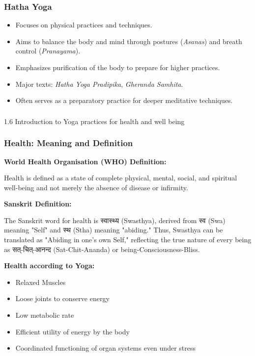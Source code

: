 \begin{frame}[fragile]\frametitle{Hatha Yoga}

      \begin{itemize}
		\item Focuses on physical practices and techniques.
		\item Aims to balance the body and mind through postures (\textit{Asanas}) and breath control (\textit{Pranayama}).
		\item Emphasizes purification of the body to prepare for higher practices.
		\item Major texts: \textit{Hatha Yoga Pradipika}, \textit{Gheranda Samhita}.
		\item Often serves as a preparatory practice for deeper meditative techniques.
	  \end{itemize}

\end{frame}



\begin{frame}[fragile]\frametitle{}
\begin{center}
{\Large 1.6 Introduction to Yoga practices for health and well being}
\end{center}
\end{frame}

\begin{frame}[fragile]\frametitle{Health: Meaning and Definition}
    \textbf{World Health Organisation (WHO) Definition:}
    
        Health is defined as a state of complete physical, mental, social, and spiritual well-being and not merely the absence of disease or infirmity.
    

    
    \textbf{Sanskrit Definition:} 
    
        The Sanskrit word for health is स्वास्थ्य (Swasthya), derived from स्व (Swa) meaning "Self" and स्थ (Stha) meaning "abiding." Thus, Swasthya can be translated as "Abiding in one's own Self," reflecting the true nature of every being as सत्-चित्-आनन्द (Sat-Chit-Ananda) or being-Consciousness-Bliss.
    

    
    \textbf{Health according to Yoga:}
    \begin{itemize}
        \item Relaxed Muscles
        \item Loose joints to conserve energy
        \item Low metabolic rate
        \item Efficient utility of energy by the body
        \item Coordinated functioning of organ systems even under stress
    \end{itemize}
\end{frame}

